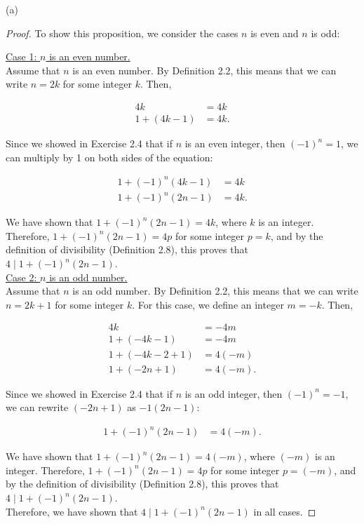 \documentclass{article}
\begin{document}
(a)

\begin{proof}
    To show this proposition, we consider the cases $n$ is even and $n$ is odd:

    \underline{Case 1: $n$ is an even number.} \\
    Assume that $n$ is an even number. By Definition 2.2, this means that we can write $n = 2k$ for some integer $k$. Then,

    \begin{align*}
        4k &= 4k \\
        1 + (4k - 1) &= 4k.
    \end{align*}

    Since we showed in Exercise 2.4 that if $n$ is an even integer, then $(-1)^n = 1$, we can multiply by 1 on both sides of the equation:

    \begin{align*}
        1 + (-1)^n(4k - 1) &= 4k \\
        1 + (-1)^n(2n - 1) &= 4k.
    \end{align*}

    We have shown that $1 + (-1)^n(2n - 1) = 4k$, where $k$ is an integer. Therefore, $1 + (-1)^n(2n - 1) = 4p$ for some integer $p = k$, and by the definition of divisibility (Definition 2.8), this proves that $4 \mid 1 + (-1)^n(2n - 1)$.\\

    \underline{Case 2: $n$ is an odd number.} \\
    Assume that $n$ is an odd number. By Definition 2.2, this means that we can write $n = 2k + 1$ for some integer $k$. For this case, we define an integer $m = -k$. Then,

    \begin{align*}
        4k &= -4m \\
        1 + (-4k - 1) &= -4m \\
        1 + (-4k - 2 + 1) &= 4(-m) \\
        1 + (-2n + 1) &= 4(-m).
    \end{align*}

    Since we showed in Exercise 2.4 that if $n$ is an odd integer, then $(-1)^n = -1$, we can rewrite $(-2n + 1)$ as $-1(2n - 1)$:

    \begin{align*}
        1 + (-1)^n(2n - 1) &= 4(-m).
    \end{align*}

    We have shown that $1 + (-1)^n(2n - 1) = 4(-m)$, where $(-m)$ is an integer. Therefore, $1 + (-1)^n(2n - 1) = 4p$ for some integer $p = (-m)$, and by the definition of divisibility (Definition 2.8), this proves that $4 \mid 1 + (-1)^n(2n - 1)$.\\

    Therefore, we have shown that $4 \mid 1 + (-1)^n(2n - 1)$ in all cases. 
\end{proof}
\end{document}
